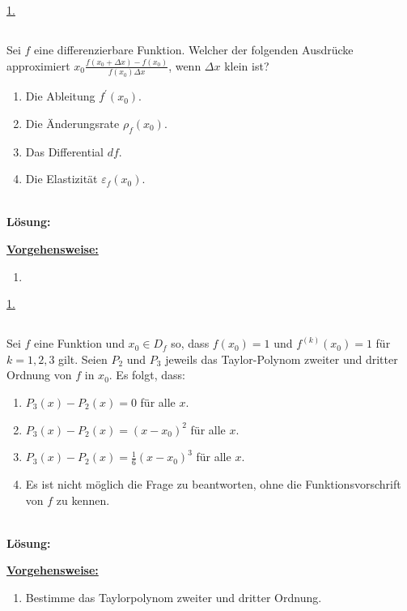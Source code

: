 \underline{1. }\\



\newpage
\subsection*{}
Sei $f$ eine differenzierbare Funktion. Welcher der folgenden Ausdrücke approximiert 
$x_0 \frac{f(x_0 + \Delta x) - f(x_0)}{f(x_0) \Delta x}$, wenn $\Delta x$ klein ist?
\renewcommand{\labelenumi}{(\alph{enumi})}
\begin{enumerate}
	\item 
	Die Ableitung $f^\prime(x_0)$.
	\item
	Die Änderungsrate $\rho_f(x_0)$.	
	\item
	Das Differential $df$.
	\item
	Die Elastizität $\varepsilon_f(x_0)$.
\end{enumerate}
\ \\
\textbf{Lösung:}
\begin{mdframed}
	\underline{\textbf{Vorgehensweise:}}
	\renewcommand{\labelenumi}{\theenumi.}
	\begin{enumerate}
		\item 
	\end{enumerate}
\end{mdframed}

\underline{1. }\\



\newpage
\subsection*{}
Sei $f$ eine Funktion und $x_0 \in D_f$ so, dass $f(x_0) = 1$ und $f^{(k)}(x_0) = 1$ für $k = 1,2,3$ gilt. Seien $P_2$ und $P_3$ jeweils das Taylor-Polynom zweiter und dritter Ordnung von $f$ in $x_0$. Es folgt, dass:
\renewcommand{\labelenumi}{(\alph{enumi})}
\begin{enumerate}
	\item 
	$P_3(x) - P_2(x) = 0 $ für alle $x$.
	\item
	$P_3(x) - P_2(x) = (x - x_0)^2 $ für alle $x$.
	\item
	$P_3(x) - P_2(x) = \frac{1}{6} (x - x_0)^3 $ für alle $x$.
	\item
	Es ist nicht möglich die Frage zu beantworten, ohne die Funktionsvorschrift von $f$ zu kennen.
\end{enumerate}
\ \\
\textbf{Lösung:}
\begin{mdframed}
	\underline{\textbf{Vorgehensweise:}}
	\renewcommand{\labelenumi}{\theenumi.}
	\begin{enumerate}
		\item Bestimme das Taylorpolynom zweiter und dritter Ordnung.
	\end{enumerate}
\end{mdframed}

